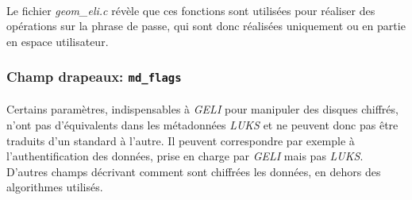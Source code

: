 \paragraph{}
Le fichier {\em geom\_eli.c} révèle que ces fonctions sont utilisées pour réaliser
des opérations sur la phrase de passe, qui sont donc réalisées uniquement ou
en partie en espace utilisateur.


\subsubsection{Champ drapeaux: \texttt{md\_flags}}
\paragraph{}
Certains paramètres, indispensables à \textit{GELI} pour manipuler des disques
chiffrés, n'ont pas d'équivalents dans les métadonnées \textit{LUKS} et ne
peuvent donc pas être traduits d'un standard à l'autre. Il peuvent correspondre
par exemple à l'authentification des données, prise en charge par \textit{GELI}
mais pas \textit{LUKS}. D'autres champs décrivant comment sont chiffrées les
données, en dehors des algorithmes utilisés.
